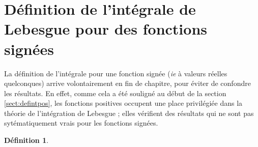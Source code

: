 \documentclass[french]{report}
\theoremstyle{plain}
\theoremstyle{definition}
\newtheorem{defi}{Définition}[section]
\theoremstyle{remark}
\begin{document}

\section{Définition de l'intégrale de Lebesgue pour des fonctions signées}

La définition de l'intégrale pour une fonction signée (\textit{ie} à valeurs réelles quelconques) arrive volontairement en fin de chapitre, pour éviter de confondre les résultats.
En effet, comme cela a été souligné au début de la section \ref{sect:defintpos}, les fonctions positives occupent une place privilégiée dans la théorie de l'intégration de Lebesgue ; elles vérifient des résultats qui ne sont pas sytématiquement vrais pour les fonctions signées.


\begin{defi}
\end{defi}
\end{document}
